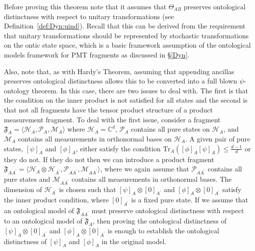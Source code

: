 \documentclass[DIV=calc,fontsize=12pt]{scrartcl} %
\theoremstyle{definition}
\theoremstyle{plain}
\newcommand{\Proj}[1]{\ensuremath{\left [ #1 \right ]}}
\newcommand{\Hilb}[1][]{\ensuremath{\mathcal{H}_{#1}}}
\newcommand{\Tr}[2][]{\ensuremath{\text{Tr}_{#1} \left ( #2 \right )}}
\begin{document}
Before proving this theorem note that it assumes that $\Theta_{AB}$
preserves ontological distinctness with respect to unitary
transformations (see Definition~\ref{def:Dyn:uind}).  Recall that this
can be derived from the requirement that unitary transformations
should be represented by stochastic transformations on the ontic state
space, which is a basic framework assumption of the ontological models
framework for PMT fragments as discussed in \S\ref{Dyn}.

Also, note that, as with Hardy's Theorem, assuming that appending
ancillas preserves ontological distinctness allows this to be
converted into a full blown $\psi$-ontology theorem.  In this case,
there are two issues to deal with.  The first is that the condition on
the inner product is not satisfied for all states and the second is
that not all fragments have the tensor product structure of a product
measurement fragment.  To deal with the first issue, consider a
fragment $\mathfrak{F}_A = \langle \Hilb[A], \mathcal{P}_A,
\mathcal{M}_A \rangle$ where $\Hilb[A] = \mathbb{C}^d$,
$\mathcal{P}_A$ contains all pure states on $\Hilb[A]$, and
$\mathcal{M}_A$ contains all measurements in orthonormal bases on
$\Hilb[A]$.  A given pair of pure states, $\Proj{\psi}_A$ and
$\Proj{\phi}_A$, either satisfy the condition $\Tr[A]{\Proj{\phi}_A
\Proj{\psi}_A} \leq \frac{d-1}{d}$ or they do not.  If they do not
then we can introduce a product fragment $\mathfrak{F}_{AA^{\prime}} =
\langle \Hilb[A] \otimes \Hilb[A^{\prime}], \mathcal{P}_{AA^{\prime}},
\mathcal{M}_{AA^{\prime}} \rangle$, where we again assume that
$\mathcal{P}_{AA^{\prime}}$ contains all pure states and
$\mathcal{M}_{AA^{\prime}}$ contains all measurements in orthonormal
bases.  The dimension of $\Hilb[A^{\prime}]$ is chosen such that
$\Proj{\psi}_{A} \otimes \Proj{0}_{A^{\prime}}$ and $\Proj{\phi}_A
\otimes \Proj{0}_{A^{\prime}}$ satisfy the inner product condition,
where $\Proj{0}_{A^{\prime}}$ is a fixed pure state.  If we assume
that an ontological model of $\mathfrak{F}_{AA^{\prime}}$ must
preserve ontological distinctness with respect to an ontological model
of $\mathfrak{F}_A$, then proving the ontological distinctness of
$\Proj{\psi}_A \otimes \Proj{0}_{A^{\prime}}$ and $\Proj{\phi}_A
\otimes \Proj{0}_{A^{\prime}}$ is enough to establish the ontological
distinctness of $\Proj{\psi}_A$ and $\Proj{\phi}_A$ in the original
model.
\end{document}
